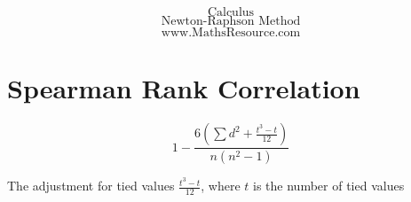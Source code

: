 \documentclass{beamer}
\begin{document}
\begin{frame}


{
\huge
\[ \mbox{Calculus} \]
\[ \mbox{Newton-Raphson Method} \]
}
{
\Large
\[ \mbox{www.MathsResource.com} \]
}
\end{frame}%


\section{Spearman Rank Correlation}



\[ 1 - \frac{6\left( \sum d^2 + \frac{t^3-t}{12} \right)}{n(n^2-1)} \]



The adjustment for tied values
$ \frac{t^3-t}{12} $, where $t$ is the number of tied values
\end{document}
